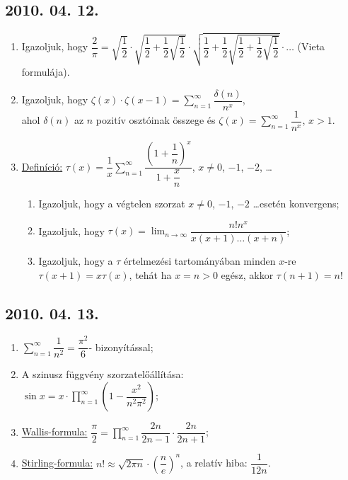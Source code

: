 \documentclass{article}
\newenvironment{abc}{\begin{enumerate}[label=\textit{\alph*})]}{\end{enumerate}}
\begin{document}
\subsection*{2010. 04. 12.}
\begin{enumerate}
\item Igazoljuk, hogy  $\dfrac{2}{\pi}=\sqrt{\dfrac{1}{2}}\cdot\sqrt{\dfrac{1}{2}+\dfrac{1}{2}\sqrt{\dfrac{1}{2}}}\cdot\sqrt{\dfrac{1}{2}+\dfrac{1}{2}\sqrt{\dfrac{1}{2}+\dfrac{1}{2}\sqrt{\dfrac{1}{2}}}}\cdot\ldots$ (Vieta formulája).
\item Igazoljuk, hogy $\zeta(x)\cdot\zeta(x-1)=\displaystyle\sum_{n=1}^{\infty}\dfrac{\delta(n)}{n^x}$,\\ ahol $\delta(n)$ az $n$ pozitív osztóinak összege és $\zeta(x)=\displaystyle\sum_{n=1}^{\infty}\dfrac{1}{n^x}$, $x>1$.
\item \underline{Definíció:} $\tau(x)=\dfrac{1}{x}\displaystyle\sum_{n=1}^{\infty}\dfrac{\left(1+\dfrac{1}{n}\right)^x}{1+\dfrac{x}{n}}$, $x\not =0$, $-1$, $-2$, \ldots
	\begin{abc}
    \item Igazoljuk, hogy a végtelen szorzat $x\not =0$, $-1$, $-2$ \ldots esetén konvergens;
	\item Igazoljuk, hogy $\tau(x)=\displaystyle\lim_{n \to \infty} \dfrac{n!n^x}{x(x+1)\ldots(x+n)}$;
	\item Igazoljuk, hogy a $\tau$ értelmezési tartományában minden $x$-re $\tau(x+1)=x\tau(x)$, tehát ha $x=n>0$ egész, akkor $\tau(n+1)=n!$
	\end{abc}

\end{enumerate}

\subsection*{2010. 04. 13.}
\begin{enumerate}
\item $\displaystyle\sum_{n=1}^{\infty} \dfrac{1}{n^2}=\dfrac{\pi^2}{6}$- bizonyítással;
\item A szinusz függvény szorzatelőállítása:\\
$\sin x=x\cdot\displaystyle\prod_{n=1}^{\infty} \left(1-\dfrac{x^2}{n^2\pi^2}\right)$;
\item \underline{Wallis-formula:} $\dfrac{\pi}{2}=\displaystyle\prod_{n=1}^{\infty} \dfrac{2n}{2n-1}\cdot\dfrac{2n}{2n+1}$;
\item \underline{Stirling-formula:} $n!\approx\sqrt{2\pi n}\cdot\left(\dfrac{n}{e}\right)^n$, a relatív hiba: $\dfrac{1}{12n}$.

\end{enumerate}
\end{document}
